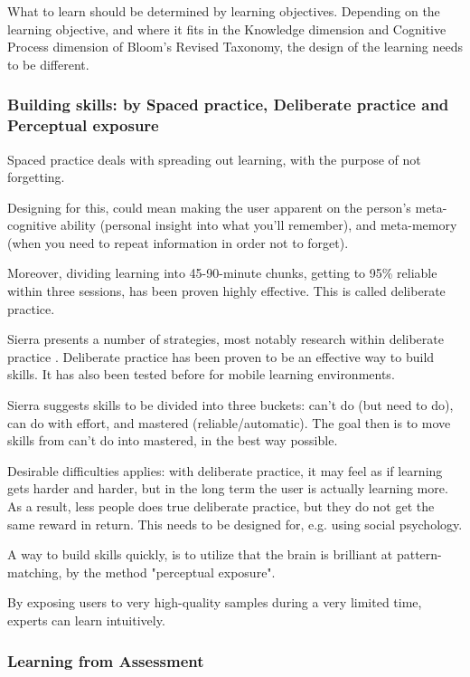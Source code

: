   What to learn should be determined by learning objectives. Depending on the learning objective, and where it fits in the Knowledge dimension and Cognitive Process dimension of Bloom's Revised Taxonomy, the design of the learning needs to be different. \cite{bloom}

  \subsubsection{Building skills: by Spaced practice, Deliberate practice and Perceptual exposure}

  Spaced practice deals with spreading out learning, with the purpose of not forgetting.

  Designing for this, could mean making the user apparent on the person's meta-cognitive ability (personal insight into what you'll remember), and meta-memory (when you need to repeat information in order not to forget).

  Moreover, dividing learning into 45-90-minute chunks, getting to 95\% reliable within three sessions, has been proven highly effective. This is called deliberate practice.

  Sierra presents a number of strategies, most notably research within deliberate practice \cite{yengin} \cite{sierra}. Deliberate practice has been proven to be an effective way to build skills. It has also been tested before for mobile learning environments. \cite{yengin}

  Sierra \cite{sierra} suggests skills to be divided into three buckets: can't do (but need to do), can do with effort, and mastered (reliable/automatic). The goal then is to move skills from can't do into mastered, in the best way possible.

  Desirable difficulties applies: with deliberate practice, it may feel as if learning gets harder and harder, but in the long term the user is actually learning more. As a result, less people does true deliberate practice, but they do not get the same reward in return. This needs to be designed for, e.g. using social psychology.

  A way to build skills quickly, is to utilize that the brain is brilliant at pattern-matching, by the method "perceptual exposure". \cite{sierra}

  By exposing users to very high-quality samples during a very limited time, experts can learn intuitively.

  \subsubsection{Learning from Assessment}

